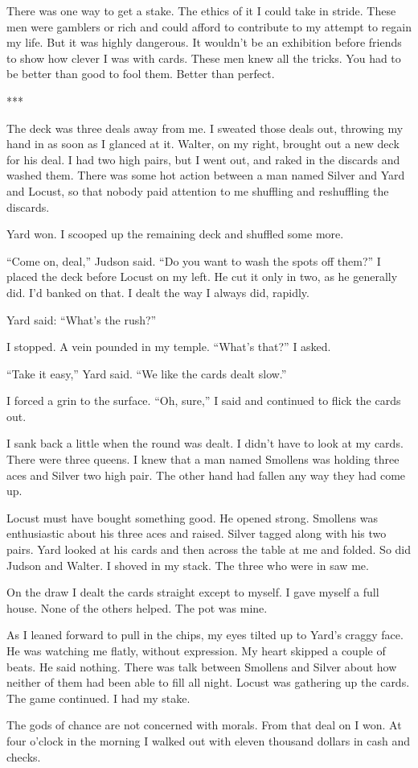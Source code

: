 \documentclass{novel}
\begin{document}
{There was one way to get a stake. The ethics of it I could take in stride. These men were gamblers or rich and could afford to contribute to my attempt to regain my life. But it was highly dangerous. It wouldn’t be an exhibition before friends to show how clever I was with cards. These men knew all the tricks. You had to be better than good to fool them. Better than perfect.

***

The deck was three deals away from me. I sweated those deals out, throwing my hand in as soon as I glanced at it. Walter, on my right, brought out a new deck for his deal. I had two high pairs, but I went out, and raked in the discards and washed them. There was some hot action between a man named Silver and Yard and Locust, so that nobody paid attention to me shuffling and reshuffling the discards.

Yard won. I scooped up the remaining deck and shuffled some more.

“Come on, deal,” Judson said. “Do you want to wash the spots off them?” I placed the deck before Locust on my left. He cut it only in two, as he generally did. I’d banked on that. I dealt the way I always did, rapidly.

Yard said: “What’s the rush?”

I stopped. A vein pounded in my temple. “What’s that?” I asked.

“Take it easy,” Yard said. “We like the cards dealt slow.”

I forced a grin to the surface. “Oh, sure,” I said and continued to flick the cards out.

I sank back a little when the round was dealt. I didn’t have to look at my cards. There were three queens. I knew that a man named Smollens was holding three aces and Silver two high pair. The other hand had fallen any way they had come up.

Locust must have bought something good. He opened strong. Smollens was enthusiastic about his three aces and raised. Silver tagged along with his two pairs. Yard looked at his cards and then across the table at me and folded. So did Judson and Walter. I shoved in my stack. The three who were in saw me.

On the draw I dealt the cards straight except to myself. I gave myself a full house. None of the others helped. The pot was mine.

As I leaned forward to pull in the chips, my eyes tilted up to Yard’s craggy face. He was watching me flatly, without expression. My heart skipped a couple of beats. He said nothing. There was talk between Smollens and Silver about how neither of them had been able to fill all night. Locust was gathering up the cards. The game continued. I had my stake.

The gods of chance are not concerned with morals. From that deal on I won. At four o’clock in the morning I walked out with eleven thousand dollars in cash and checks.

}
\end{document}
